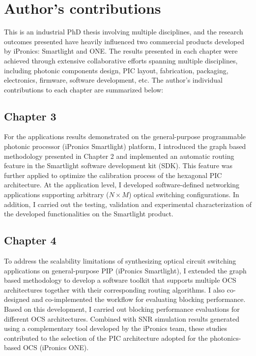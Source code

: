 
\chapter*{Author's contributions} \label{sec:contributions}
This is an industrial PhD thesis involving multiple disciplines, and the research outcomes presented have heavily influenced two commercial products developed by iPronics: Smartlight and ONE.
The results presented in each chapter were achieved through extensive collaborative efforts spanning multiple disciplines, including photonic components design, PIC layout, fabrication, packaging, electronics, firmware, software development, etc.
The author's individual contributions to each chapter are summarized below:

\section*{Chapter 3}
For the applications results demonstrated on the general-purpose programmable photonic processor (iPronics Smartlight) platform, I introduced the graph based methodology presented in Chapter 2 and implemented an automatic routing feature in the Smartlight software development kit (SDK).
This feature was further applied to optimize the calibration process of the hexagonal PIC architecture.
At the application level, I developed software-defined networking applications supporting arbitrary ($N \times M$) optical switching configurations.
In addition, I carried out the testing, validation and experimental characterization of the developed functionalities on the Smartlight product.

\section*{Chapter 4}
To address the scalability limitations of synthesizing optical circuit switching applications on general-purpose PIP (iPronics Smartlight), I extended the graph based methodology to develop a software toolkit that supports multiple OCS architectures together with their corresponding routing algorithms.
I also co-designed and co-implemented the workflow for evaluating blocking performance.
Based on this development, I carried out blocking performance evaluations for different OCS architectures.
Combined with SNR simulation results generated using a complementary tool developed by the iPronics team, these studies contributed to the selection of the PIC architecture adopted for the photonics-based OCS (iPronics ONE).

